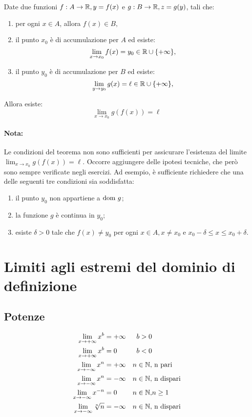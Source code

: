 \begin{teo}
Date due funzioni $f:A\rightarrow\mathbb{R},y=f(x)$ e $g:B\rightarrow\mathbb{R},z=g(y)$, tali che:
\begin{enumerate}
\item per ogni $x\in A$, allora $f(x)\in B,$
\item il punto $x_0$ è di accumulazione per $A$ ed esiste:
\[\lim_{x\to x_0}{f(x)}=y_0\in\mathbb{R}\cup\{+\infty\},\]
\item il punto $y_0$ è di accumulazione per $B$ ed esiste:
\[\lim_{y\to y_0}{g(x)}=\ell\in\mathbb{R}\cup\{+\infty\},\]
\end{enumerate}
Allora esiste:
\[\lim_{x\to x_0}{g(f(x))}=\ell\]
\paragraph{Nota:}
Le condizioni del teorema non sono sufficienti per assicurare l'esistenza del limite $\lim_{x\to x_0}{g(f(x))}=\ell$. Occorre aggiungere delle ipotesi tecniche, che però sono sempre verificate negli esercizi. Ad esempio, è sufficiente richiedere che una delle seguenti tre condizioni sia soddisfatta:
\begin{enumerate}
\item il punto $y_0$ non appartiene a $\text{dom }{g}$;
\item la funzione $g$ è continua in $y_0$;
\item esiste $\delta>0$ tale che $f(x)\neq y_0$ per ogni $x\in A,x\neq x_0$ e $x_0-\delta\leq x\leq x_0+\delta$.
\end{enumerate}
\end{teo}

\section{Limiti agli estremi del dominio di definizione}
\subsection{Potenze}

\begin{align*}
\lim_{x\to+\infty}{x^b}&=+\infty         & b>0      &\\
\lim_{x\to+\infty}{x^b}&=0               & b<0      &\\
\lim_{x\to-\infty}{x^n}&=+\infty         & n\in \mathbb{N}, &\text{ n pari} \\
\lim_{x\to-\infty}{x^n}&=-\infty         & n\in \mathbb{N}, &\text{ n dispari} \\
\lim_{x\to-\infty}{x^{-n}}&=0            & n\in \mathbb{N}, &n\geq 1 \\
\lim_{x\to-\infty}{\sqrt[n]{n}}&=-\infty & n\in \mathbb{N}, &\text{ n dispari}
\end{align*}

